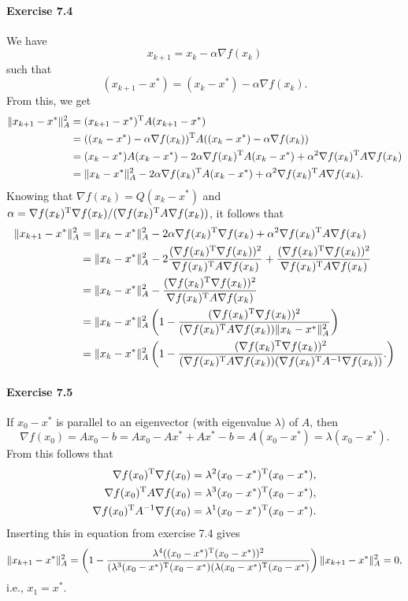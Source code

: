 \paragraph{Exercise 7.4} %
We have
\[
x_{k+1} = x_k - \alpha \nabla f(x_k)
\]
such that
\[
(x_{k+1} - x^*) = (x_k-x^*) - \alpha \nabla f(x_k).
\]
From this, we get
\[
\begin{split}
\|x_{k+1} - x^*\|_A^2
&= (x_{k+1} - x^*)^{\text{\upshape T}} A (x_{k+1} - x^*)\\
&= ((x_{k} - x^*) - \alpha\nabla f(x_k))^{\text{\upshape T}} A ((x_k - x^*) - \alpha \nabla f(x_k))\\
&= (x_{k} - x^*) A (x_k - x^*) - 2\alpha\nabla f(x_k)^{\text{\upshape T}} A(x_k-x^*) + \alpha^2\nabla f(x_k)^{\text{\upshape T}} A \nabla f(x_k)\\
&= \|x_{k} - x^*\|_A^2 - 2\alpha\nabla f(x_k)^{\text{\upshape T}} A(x_k-x^*) + \alpha^2\nabla f(x_k)^{\text{\upshape T}} A \nabla f(x_k).
\end{split}
\]
Knowing that $\nabla f(x_k)=Q(x_k - x^*)$ and $\alpha = \nabla
f(x_k)^{\text{\upshape T}}\nabla f(x_k)/(\nabla f(x_k)^{\text{\upshape T}} A\nabla f(x_k))$, it follows that
\[
\begin{split}
\|x_{k+1} - x^*\|_A^2
&= \|x_k - x^*\|_A^2  - 2\alpha \nabla f(x_k)^{\text{\upshape T}} \nabla f(x_k) + \alpha^2\nabla f(x_k)^{\text{\upshape T}} A\nabla f(x_k)\\
&= \|x_k - x^*\|_A^2
  - 2\frac{(\nabla f(x_k)^{\text{\upshape T}} \nabla f(x_k))^2}{\nabla f(x_k)^{\text{\upshape T}} A \nabla f(x_k)}
  + \frac{(\nabla f(x_k)^{\text{\upshape T}} \nabla f(x_k))^2}{\nabla f(x_k)^{\text{\upshape T}} A \nabla f(x_k)}\\
&= \|x_k - x^*\|_A^2
  - \frac{(\nabla f(x_k)^{\text{\upshape T}} \nabla f(x_k))^2}{\nabla f(x_k)^{\text{\upshape T}} A \nabla f(x_k)}\\
&= \|x_k - x^*\|_A^2
\left(
1
- \frac{(\nabla f(x_k)^{\text{\upshape T}} \nabla f(x_k))^2}{(\nabla f(x_k)^{\text{\upshape T}} A \nabla f(x_k))\|x_k - x^*\|_A^2}
\right)\\
&= \|x_k - x^*\|_A^2
\left(
1
- \frac{(\nabla f(x_k)^{\text{\upshape T}} \nabla f(x_k))^2}{(\nabla f(x_k)^{\text{\upshape T}} A \nabla f(x_k))(\nabla f(x_k)^{\text{\upshape T}} A^{-1} \nabla f(x_k))}.
\right)
\end{split}
\]

\paragraph{Exercise 7.5} %
If $x_0-x^*$ is parallel to an eigenvector (with eigenvalue $\lambda$) of $A$, then
\[
\nabla f(x_0)
= A x_0 - b
= A x_0 - A x^* + Ax^* -b
= A(x_0 - x^*)
= \lambda (x_0-x^*).
\]
From this follows that
\begin{align*}
\nabla f(x_0)^{\text{\upshape T}} \nabla f(x_0)       &= \lambda^2 (x_0-x^*)^{\text{\upshape T}} (x_0-x^*),\\
\nabla f(x_0)^{\text{\upshape T}} A\nabla f(x_0)      &= \lambda^3 (x_0-x^*)^{\text{\upshape T}} (x_0-x^*),\\
\nabla f(x_0)^{\text{\upshape T}} A^{-1}\nabla f(x_0) &= \lambda^1 (x_0-x^*)^{\text{\upshape T}} (x_0-x^*).
\end{align*}
Inserting this in equation from exercise 7.4 gives
\[
  \|x_{k+1} - x^*\|_A^2
  = \left(1 - \frac{\lambda^4 ((x_0-x^*)^{\text{\upshape T}}(x_0-x^*))^2}{(\lambda^3 (x_0-x^*)^{\text{\upshape T}}(x_0-x^*)(\lambda (x_0-x^*)^{\text{\upshape T}}(x_0-x^*)}\right)\|x_{k+1} - x^*\|_A^2
=0,
\]
i.e., $x_1 = x^*$.


